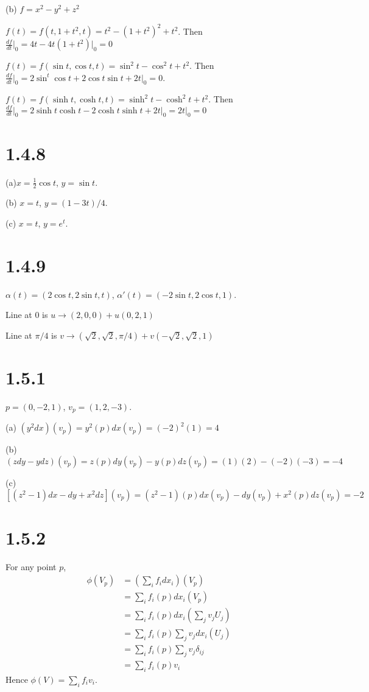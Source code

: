 \documentclass[12pt]{article}
\begin{document}
(b) $f = x^2 - y^2 + z^2$

$f(t) = f(t, 1+t^2, t) = t^2 - (1+t^2)^2 + t^2$. Then $\frac{df}{dt}\bigg|_0 = 4t-4t(1+t^2)\bigg|_0 =  0$

$f(t) = f(\sin t, \cos t, t) = \sin^2 t - \cos^2 t + t^2$. Then $\frac{df}{dt}\bigg|_0 = 2\sin^t \cos t + 2 \cos t \sin t + 2t \bigg|_0 = 0$.

$f(t) = f(\sinh t, \cosh t, t) = \sinh^2 t - \cosh^2 t + t^2$. Then $\frac{df}{dt}\bigg|_0 = 2\sinh t \cosh t - 2 \cosh t\sinh t + 2t \bigg|_0= 2t \bigg|_0 = 0$

\section*{1.4.8}
(a)$x=\frac{1}{2} \cos t$, $y=\sin t$.

(b) $x = t$, $y= (1 -3t)/4$.

(c) $x = t$, $y=e^t$.


\section*{1.4.9}
$\alpha(t) = (2\cos t, 2 \sin t, t)$,
$\alpha'(t) = (-2\sin t, 2\cos t, 1)$.

Line at $0$ is $u \rightarrow (2, 0, 0) + u(0, 2, 1)$

Line at $\pi/4$ is $v \rightarrow (\sqrt{2}, \sqrt{2}, \pi/4) + v(-\sqrt{2}, \sqrt{2}, 1)$

\section*{1.5.1}
 $p = (0,-2, 1)$, $v_p=(1,2, -3)$.
  
(a) $(y^2dx)(v_p) = y^2(p)dx(v_p) = (-2)^2 (1)= 4$

(b) $(zdy-ydz)(v_p) = z(p)dy(v_p) - y(p)dz(v_p) = (1)(2) - (-2)(-3) = -4 $

(c) $[(z^2-1)dx - dy + x^2dz](v_p) = (z^2-1)(p)dx(v_p) - dy(v_p) + x^2(p) dz(v_p) = -2$

\section*{1.5.2}
For any point $p$, $$\begin{aligned}
	\phi(V_p) &= (\sum_i f_i dx_i)(V_p) \\ 
	      &=\sum_i f_i(p) dx_i(V_p) \\ 
	      &= \sum_i f_i(p) dx_i(\sum_j v_j U_j) \\ 
	      &= \sum_i f_i(p) \sum_j v_j dx_i(U_j) \\ 
	      &= \sum_i f_i(p)\sum_j v_j \delta_{ij} \\ 
	      &= \sum_i f_i(p)v_i
\end{aligned} $$
Hence $\phi(V) = \sum_i f_i v_i$.
\end{document}
